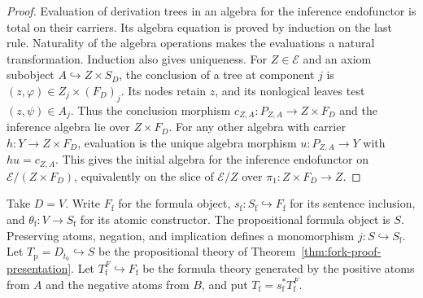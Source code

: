 \begin{proof}
Evaluation of derivation trees in an algebra for the inference
endofunctor is total on their carriers. Its algebra equation is
proved by induction on the last rule. Naturality of the algebra
operations makes the evaluations a natural transformation.
Induction also gives uniqueness. For $Z\in\mathcal E$ and an axiom
subobject $A\hookrightarrow Z\times S_D$, the conclusion of a tree
at component $j$ is $(z,\varphi)\in Z_j\times (F_D)_j$. Its nodes
retain $z$, and its nonlogical leaves test $(z,\psi)\in A_j$.
Thus the conclusion morphism $c_{Z,A}:P_{Z,A}\to Z\times F_D$
and the inference algebra lie over $Z\times F_D$. For any other
algebra with carrier $h:Y\to Z\times F_D$, evaluation is the unique
algebra morphism $u:P_{Z,A}\to Y$ with $hu=c_{Z,A}$. This gives the initial algebra for the inference endofunctor on
$\mathcal E/(Z\times F_D)$, equivalently on the slice of $\mathcal E/Z$
over $\pi_1:Z\times F_D\to Z$.
\end{proof}

Take $D=V$. Write $F_{\mathrm f}$ for the formula object,
$s_{\mathrm f}:S_{\mathrm f}\hookrightarrow F_{\mathrm f}$ for
its sentence inclusion, and $\theta_{\mathrm f}:V\to S_{\mathrm f}$
for its atomic constructor. The propositional formula
object is $S$. Preserving atoms, negation, and implication defines
a monomorphism $j:S\hookrightarrow S_{\mathrm f}$.
Let $T_{\mathrm p}=D_{t_0}\hookrightarrow S$ be the
propositional theory of Theorem~\ref{thm:fork-proof-presentation}.
Let $T_{\mathrm f}^F\hookrightarrow F_{\mathrm f}$ be the
formula theory generated by the positive atoms from $A$ and the
negative atoms from $B$, and put
$T_{\mathrm f}=s_{\mathrm f}^*T_{\mathrm f}^F$.

